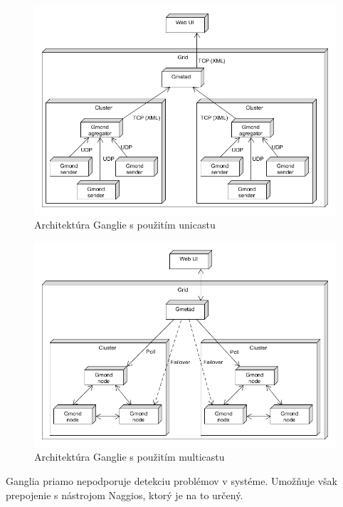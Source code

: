 \documentclass[a4paper, usesections, upjsfrontpage, thesismargins, thesislinespacing]{rnthesis}
\begin{document}
\begin{figure}
	\begin{center}
		\includegraphics[scale=0.55]{ganglia-architecture.png}
	\end{center}
	\caption{Architektúra Ganglie s použitím unicastu}
\end{figure}

\begin{figure}
	\begin{center}
		\includegraphics[scale=0.55]{ganglia-architecture-multicast.png}
	\end{center}
	\caption{Architektúra Ganglie s použitím multicastu}
\end{figure}


Ganglia priamo nepodporuje detekciu problémov v systéme.
Umožňuje však prepojenie s nástrojom Naggios, ktorý je na to určený.
\end{document}
